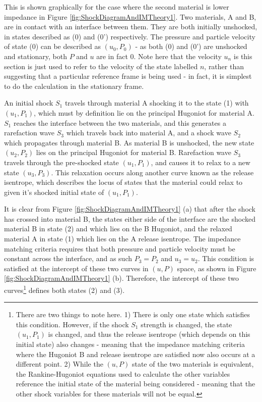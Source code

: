 This is shown graphically for the case where the second material is lower impedance in Figure \ref{fig:ShockDiagramAndIMTheory1}. Two materials, A and B, are in contact with an interface between them. They are both initially unshocked, in states described as (0) and (0') respectively. The pressure and particle velocity of state (0) can be described as $(u_0, P_0)$ - as both (0) and (0') are unshocked and stationary, both $P$ and $u$ are in fact 0. Note here that the velocity $u_n$ is this section is just used to refer to the velocity of the state labelled $n$, rather than suggesting that a particular reference frame is being used - in fact, it is simplest to do the calculation in the stationary frame.

An initial shock $S_1$ travels through material A shocking it to the state (1) with $(u_1, P_1)$, which must by definition lie on the principal Hugoniot for material A. $S_1$ reaches the interface between the two materials, and this generates a rarefaction wave $S_3$ which travels back into material A, and a shock wave $S_2$ which propagates through material B. As material B is unshocked, the new state $(u_2, P_2)$ lies on the principal Hugoniot for material B. Rarefaction wave $S_3$ travels through the pre-shocked state $(u_1, P_1)$, and causes it to relax to a new state $(u_3, P_3)$. This relaxation occurs along another curve known as the release isentrope, which describes the locus of states that the material could relax to given it's shocked initial state of $(u_1, P_1)$. 

It is clear from Figure \ref{fig:ShockDiagramAndIMTheory1} (a) that after the shock has crossed into material B, the states either side of the interface are the shocked material B in state (2) and which lies on the B Hugoniot, and the relaxed material A in state (1) which lies on the A release isentrope. The impedance matching criteria requires that both pressure and particle velocity must be constant across the interface, and as such $P_3 = P_2$ and $u_3 = u_2$. This condition is satisfied at the intercept of these two curves in $(u, P)$ space, as shown in Figure \ref{fig:ShockDiagramAndIMTheory1} (b). Therefore, the intercept of these two curves\footnote{There are two things to note here. 1) There is only one state which satisfies this condition. However, if the shock $S_1$ strength is changed, the state $(u_1, P_1)$ is changed, and thus the release isentrope (which depends on this initial state) also changes - meaning that the impedance matching criteria where the Hugoniot B and release isentrope are satisfied now also occurs at a different point. 2) While the $(u, P)$ state of the two materials is equivalent, the Rankine-Hugoniot equations used to calculate the other variables reference the initial state of the material being considered - meaning that the other shock variables for these materials will not be equal.} defines both states (2) and (3). 

